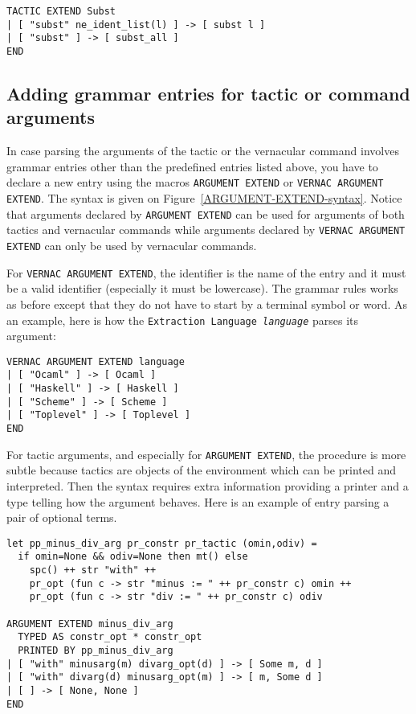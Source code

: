 \begin{verbatim}
TACTIC EXTEND Subst
| [ "subst" ne_ident_list(l) ] -> [ subst l ]
| [ "subst" ] -> [ subst_all ]
END
\end{verbatim}

\subsection{Adding grammar entries for tactic or command arguments}

In case parsing the arguments of the tactic or the vernacular command
involves grammar entries other than the predefined entries listed
above, you have to declare a new entry using the macros
\verb=ARGUMENT EXTEND= or \verb=VERNAC ARGUMENT EXTEND=. The syntax is
given on Figure~\ref{ARGUMENT-EXTEND-syntax}. Notice that arguments
declared by \verb=ARGUMENT EXTEND= can be used for arguments of both
tactics and vernacular commands while arguments declared by
\verb=VERNAC ARGUMENT EXTEND= can only be used by vernacular commands.

For \verb=VERNAC ARGUMENT EXTEND=, the identifier is the name of the
entry and it must be a valid {\ocaml} identifier (especially it must
be lowercase).  The grammar rules works as before except that they do
not have to start by a terminal symbol or word.  As an example, here
is how the {\Coq} {\tt Extraction Language {\it language}} parses its
argument:

\begin{verbatim}
VERNAC ARGUMENT EXTEND language
| [ "Ocaml" ] -> [ Ocaml ]
| [ "Haskell" ] -> [ Haskell ]
| [ "Scheme" ] -> [ Scheme ]
| [ "Toplevel" ] -> [ Toplevel ]
END
\end{verbatim}

For tactic arguments, and especially for \verb=ARGUMENT EXTEND=, the
procedure is more subtle because tactics are objects of the {\Coq}
environment which can be printed and interpreted. Then the syntax
requires extra information providing a printer and a type telling how
the argument behaves. Here is an example of entry parsing a pair of
optional {\Coq} terms.

\begin{verbatim}
let pp_minus_div_arg pr_constr pr_tactic (omin,odiv) = 
  if omin=None && odiv=None then mt() else
    spc() ++ str "with" ++
    pr_opt (fun c -> str "minus := " ++ pr_constr c) omin ++
    pr_opt (fun c -> str "div := " ++ pr_constr c) odiv

ARGUMENT EXTEND minus_div_arg 
  TYPED AS constr_opt * constr_opt
  PRINTED BY pp_minus_div_arg
| [ "with" minusarg(m) divarg_opt(d) ] -> [ Some m, d ]
| [ "with" divarg(d) minusarg_opt(m) ] -> [ m, Some d ]
| [ ] -> [ None, None ]
END
\end{verbatim}

